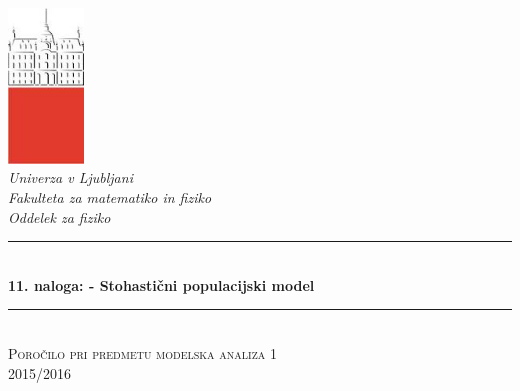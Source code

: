 \documentclass[slovene,11pt,a4paper]{article}
\numberwithin{equation}{section} %
\numberwithin{figure}{section} %
\numberwithin{table}{section} %
\begin{document}
\begin{titlepage}

\newcommand{\HRule}{\rule{\linewidth}{0.5mm}} %

\center %


 

\includegraphics[width=2cm]{slike/aaa}\\[0.5cm]
 
\textit{Univerza v Ljubljani}\\
\textit{Fakulteta za {\color{red}matematiko in fiziko}}\\[0.5cm]

\emph{Oddelek za fiziko}\\[0.5cm] %


\HRule \\[0.4cm]
\huge {\bfseries 11. naloga: - Stohastični populacijski model}\\[0.4cm] %
\HRule \\[0.5cm] 

 \textsc{\large Poročilo pri predmetu modelska analiza 1}\\
 \textsc{\large 2015/2016}\\[1cm] %
 

\end{titlepage}
\end{document}
